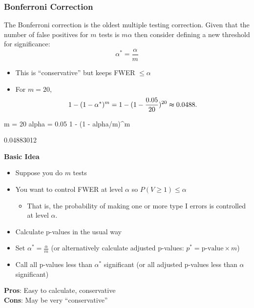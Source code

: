 \documentclass[a4paper]{article}\usepackage[]{graphicx}\usepackage[]{xcolor}
\begin{document}
\subsubsection{Bonferroni Correction}
The \textcolor{myred}{Bonferroni correction} is the oldest multiple testing correction.
Given that the number of false positives for \( m \) tests is \( m \alpha \) then consider defining a new threshold for significance:
\[
	\alpha^\ast = \frac{\alpha}{m}
\]
\begin{itemize}
	\item This is ``conservative'' but keeps FWER \( \leq \alpha \) 
	\item For \( m = 20 \),
	\[
		1 - (1 - \alpha^\ast)^m = 1 - (1 - \frac{0.05}{20})^{20} \thickapprox 0.0488.
	\]
\end{itemize}
\begin{Schunk}
\begin{Sinput}
m = 20
alpha = 0.05
1 - (1 - alpha/m)^m
\end{Sinput}
\begin{Soutput}
[1] 0.04883012
\end{Soutput}
\end{Schunk}
\textbf{Basic Idea}
\begin{itemize}
	\item Suppose you do \( m \) tests
	\item You want to control FWER at level \( \alpha \) so \( P(V \geq 1) \leq \alpha \)
	\begin{itemize}
		\item That is, the probability of making one or more type I errors is controlled at level \( \alpha \).
	\end{itemize}
	\item Calculate p-values in the usual way
	\item Set \( \alpha^\ast = \frac{\alpha}{m} \) (or alternatively calculate adjusted p-values: \( p^\ast = \text{p-value} \times m \))
	\item Call all p-values less than \( \alpha^\ast \) significant (or all adjusted p-values less than \( \alpha \) significant)
\end{itemize}
\textbf{Pros}: Easy to calculate, conservative\\
\textbf{Cons}: May be very ``conservative''
\end{document}
